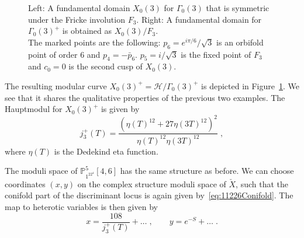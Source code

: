 \documentclass[11pt,a4paper]{article}
\numberwithin{equation}{section}
\numberwithin{table}{section}\setlength{\multlinegap}{25pt}
\begin{document}
\begin{figure}
    \centering
    \quad
    \raisebox{-0.5\height}{$\Longrightarrow$}
    \quad
    \caption{Left: A fundamental domain $X_0(3)$ for $\Gamma_0(3)$ that is symmetric under the Fricke involution $F_3$. Right: A fundamental domain for $\Gamma_0(3)^+$ is obtained as $X_0(3)/F_3$.\\The marked points are the following: $p_6=e^{i\pi/6}/\sqrt{3}$ is an orbifold point of order $6$ and $p_4=-\bar{p}_6$. $p_5=i/\sqrt{3}$ is the fixed point of $F_3$ and $c_0=0$ is the second cusp of $X_0(3)$.}
    \label{fig:gamma3fundomain}
\end{figure}
The resulting modular curve $X_0(3)^+=\mathcal{H}/\Gamma_0(3)^+$ is depicted in Figure~\ref{fig:gamma3fundomain}. We see that it shares the qualitative properties of the previous two examples. The Hauptmodul for $X_0(3)^+$ is given by~\cite{Harnad:1998hh}
\begin{equation}
    j_3^+(T)=\frac
{\left(\eta(T)^{12}+27\eta(3T)^{12}\right)^2}
{\eta(T)^{12}\eta(3T)^{12}}\;,
\end{equation}
where $\eta(T)$ is the Dedekind eta function.

The moduli space of $\mathbb{P}^5_{1^22^4}[4,6]$ has the same structure as before. We can choose coordinates $(x,y)$ on the complex structure moduli space of $\check{X}$, such that the conifold part of the discriminant locus is again given by~\ref{eq:11226Conifold}. The map to heterotic variables is then given by
\begin{equation}
    \label{eq:112222HeteroticCoordinateRelation}
    x=\frac{108}{j_3^+(T)}+\dots\;,\qquad y=e^{-S}+\dots\;.
\end{equation}
\end{document}
